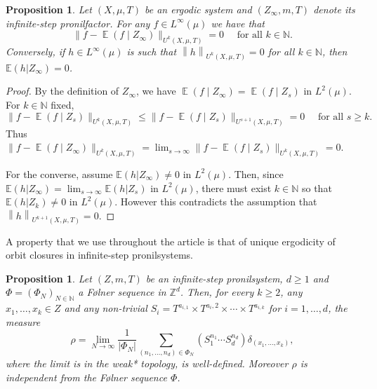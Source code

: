 \documentclass[letter, 11pt]{article}
\newtheorem{prop}[theo]{Proposition}
\theoremstyle{definition}
\theoremstyle{plain}
\newcommand{\N}{\mathbb{N}}
\newcommand{\Z}{\mathbb{Z}}
\newcommand{\norm}[1]{\left\lVert#1\right\rVert}
\providecommand{\norm}[1]{\lVert #1\rVert}
\newcommand{\1}{\mathbbm{1}}
\newcommand{\E}{\operatorname{\mathbb{E}}}
\begin{document}
    \begin{prop} \label{infinite step nilfactor and HK seminorms}
    Let $(X,\mu,T)$ be an ergodic system and $(Z_{\infty},m,T)$ denote its infinite-step pronilfactor. For any $f \in L^{\infty}(\mu)$ we have that 
        \begin{equation*}
            \lVert f - \E(f \mid Z_{\infty}) \rVert_{U^k(X,\mu,T)} = 0 \quad \text{ for all } k \in \N.
        \end{equation*}
    Conversely, if $h\in L^{\infty}(\mu)$ is such that $\norm{h}_{U^k(X,\mu,T)}=0$ for all $k\in \N$, then $\mathbb{E}(h | Z_{\infty})=0$. 
    \end{prop}

    \begin{proof} By the definition of $Z_{\infty}$, we have $\displaystyle \E(f \mid Z_{\infty}) = \E(f \mid Z_s)$ in $L^2(\mu)$. For  $k \in \N$ fixed,
        \begin{equation*}
            \lVert f - \E(f \mid Z_s) \rVert_{U^k(X,\mu,T)} \leq \lVert f - \E(f \mid Z_s) \rVert_{U^{s+1}(X,\mu,T)} = 0 \quad \text{ for all } s \geq k.
        \end{equation*}
        Thus $\displaystyle \lVert f - \E(f \mid Z_{\infty}) \rVert_{U^k(X,\mu,T)} = \lim_{s \to \infty} \lVert f - \E(f \mid Z_s) \rVert_{U^k(X,\mu,T)} =0$.

        For the converse, assume $\mathbb{E}(h | Z_{\infty}) \neq 0$ in $L^2(\mu)$. Then, since $\mathbb{E}(h | Z_{\infty})= \lim_{s\to \infty} \mathbb{E}(h | Z_s)$ in $L^2(\mu)$, there must exist $k\in \N$ so that $\mathbb{E}(h | Z_k) \neq 0$ in $L^2(\mu)$. However this contradicts the assumption that $\norm{h}_{U^{k+1}(X,\mu,T)}=0$.
    \end{proof}
A property that we use throughout the article is that of unique ergodicity of 
orbit closures in infinite-step pronilsystems.    
\begin{prop} \label{lemma Zd action in infinite set pronilsystem} \label{appendix lemam to interchange limits}
    Let $(Z, m,T)$ be an infinite-step pronilsystem, $d \geq 1$ and $\Phi=(\Phi_N)_{N\in \N}$ a F\o lner sequence in $\Z^d$. Then, for every $k \geq 2$, any $x_1, \ldots, x_k \in Z$ and any non-trivial $S_i = T^{a_{i,1}} \times T^{a_i,2} \times \cdots \times T^{a_{i,k}}$ for $i =1, \ldots , d$, the measure 
    \begin{equation*}
        \rho =  \lim_{N \to \infty} \frac{1}{|\Phi_N|} \sum_{(n_1, \dots, n_d) \in \Phi_N} (S_1^{n_1} \cdots  S_d^{n_d}) \delta_{(x_1,\dots,x_k)},
    \end{equation*}
    where the limit is in the weak* topology, is well-defined. Moreover $\rho$ is independent from the F\o lner sequence $\Phi$. 
\end{prop}
\end{document}
